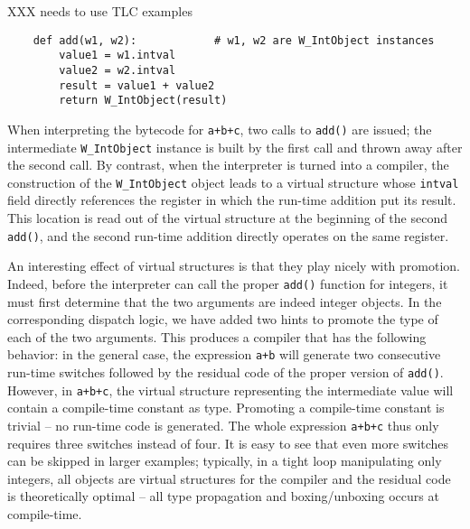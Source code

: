 XXX needs to use TLC examples
\begin{verbatim}
    def add(w1, w2):            # w1, w2 are W_IntObject instances
        value1 = w1.intval
        value2 = w2.intval
        result = value1 + value2
        return W_IntObject(result)
\end{verbatim}

When interpreting the bytecode for \texttt{a+b+c}, two calls to \texttt{add()} are
issued; the intermediate \texttt{W\_IntObject} instance is built by the first
call and thrown away after the second call.  By contrast, when the
interpreter is turned into a compiler, the construction of the
\texttt{W\_IntObject} object leads to a virtual structure whose \texttt{intval}
field directly references the register in which the run-time addition
put its result.  This location is read out of the virtual structure at
the beginning of the second \texttt{add()}, and the second run-time addition
directly operates on the same register.

An interesting effect of virtual structures is that they play nicely with
promotion.  Indeed, before the interpreter can call the proper \texttt{add()}
function for integers, it must first determine that the two arguments
are indeed integer objects.  In the corresponding dispatch logic, we
have added two hints to promote the type of each of the two arguments.
This produces a compiler that has the following behavior: in the general
case, the expression \texttt{a+b} will generate two consecutive run-time
switches followed by the residual code of the proper version of
\texttt{add()}.  However, in \texttt{a+b+c}, the virtual structure representing
the intermediate value will contain a compile-time constant as type.
Promoting a compile-time constant is trivial – no run-time code is
generated.  The whole expression \texttt{a+b+c} thus only requires three
switches instead of four.  It is easy to see that even more switches can
be skipped in larger examples; typically, in a tight loop manipulating
only integers, all objects are virtual structures for the compiler and
the residual code is theoretically optimal – all type propagation and
boxing/unboxing occurs at compile-time.
